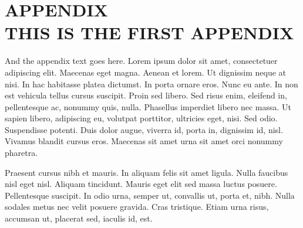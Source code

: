 


\appendix %

\chapter*{APPENDIX \\ THIS IS THE FIRST APPENDIX} %


\setcounter{chapter}{1} %

And the appendix text goes here. Lorem ipsum dolor sit amet, consectetuer
adipiscing elit. Maecenas eget magna. Aenean et lorem. Ut dignissim neque
at nisi. In hac habitasse platea dictumst. In porta ornare eros. Nunc eu ante.
In non est vehicula tellus cursus suscipit. Proin sed libero. Sed risus
enim, eleifend in, pellentesque ac, nonummy quis, nulla. Phasellus
imperdiet libero nec massa. Ut sapien libero, adipiscing eu,
volutpat porttitor, ultricies eget, nisi. Sed odio. Suspendisse
potenti. Duis dolor augue, viverra id, porta in, dignissim id, nisl.
Vivamus blandit cursus eros. Maecenas sit amet urna sit amet orci
nonummy pharetra.

Praesent cursus nibh et mauris. In aliquam felis sit amet ligula.
Nulla faucibus nisl eget nisl. Aliquam tincidunt. Mauris eget elit
sed massa luctus posuere. Pellentesque suscipit. In odio urna,
semper ut, convallis ut, porta et, nibh. Nulla sodales metus nec
velit posuere gravida. Cras tristique. Etiam urna risus, accumsan
ut, placerat sed, iaculis id, est.

